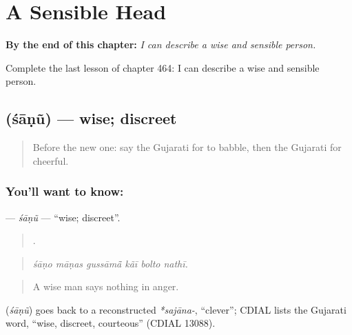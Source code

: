 
\chapter{A Sensible Head}
\label{ch:gu-a-sensible-head}

\begin{chapteropening}
\textbf{By the end of this chapter:} \emph{I can describe a wise and sensible person.}

Complete the last lesson of chapter 464: I can describe a wise and sensible person.
\end{chapteropening}

\section[\texorpdfstring{\gu{શાણું} (śāṇũ)}{શાણું (śāṇũ)}]{ (śāṇũ) — wise; discreet}

\label{lesson:GU-C464-sanu}



\begin{quote}
Before the new one: say the Gujarati for to babble, then the Gujarati for cheerful.
\end{quote}

\subsection*{You'll want to know: }
\textbf{} — \emph{śāṇũ} — \textquotedblleft{}wise; discreet\textquotedblright{}.

\begin{quote}
     .
\end{quote}

\begin{quote}
\emph{śāṇo māṇas gussāmā̃ kãī bolto nathī.}
\end{quote}

\begin{quote}
A wise man says nothing in anger.
\end{quote}

\begin{cousinweb}
\textbf{} (\emph{śāṇũ}) goes back to a reconstructed \emph{*sajāna-}, \textquotedblleft{}clever\textquotedblright{}; CDIAL lists the Gujarati word, \textquotedblleft{}wise, discreet, courteous\textquotedblright{} (CDIAL 13088).
\end{cousinweb}

